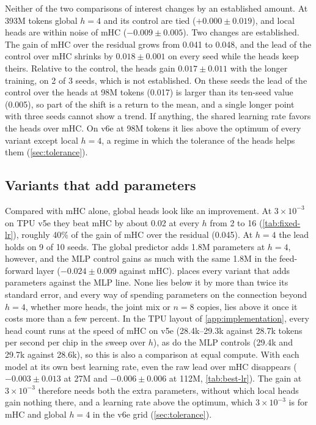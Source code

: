 \documentclass[11pt, a4paper]{article}
\newcommand{\lr}[1]{\ensuremath{#1 \times 10^{-3}}}
\begin{document}
Neither of the two comparisons of interest changes by an established amount. At 393M tokens global $h = 4$ and its control are tied
($+0.000 \pm 0.019$), and local heads are within noise of mHC ($-0.009 \pm 0.005$). Two changes are established. The gain of mHC over the residual grows from 0.041 to 0.048,
and the lead of the control over mHC shrinks by $0.018 \pm 0.001$ on every seed while the heads keep theirs. Relative to the control, the
heads gain $0.017 \pm 0.011$ with the longer training, on 2 of 3 seeds, which is not established. On these seeds the lead of the control over the heads at 98M tokens (0.017) is larger than its ten-seed value
(0.005), so part of the shift is a return to the mean, and a single longer point with three seeds cannot show a trend. If anything, the shared learning rate favors the heads over mHC. On v6e at 98M tokens it
lies above the optimum of every variant except local $h = 4$, a regime in which the tolerance of the heads helps them
(\cref{sec:tolerance}).

\subsection{Variants that add parameters}
\label{sec:fixed-lr}

Compared with mHC alone, global heads look like an improvement. At \lr{3} on TPU v5e they beat mHC by about 0.02 at every $h$ from 2 to
16 (\cref{tab:fixed-lr}), roughly 40\% of the gain of mHC over the residual (0.045). At $h = 4$ the lead holds on 9 of 10 seeds.
The global predictor adds 1.8M parameters at $h = 4$, however, and the MLP control gains as much with the same 1.8M in the
feed-forward layer ($-0.024 \pm 0.009$ against mHC).  places every variant that adds parameters against the MLP
line. None lies below it by more than twice its standard error, and every way of spending parameters on the connection beyond $h =
4$, whether more heads, the joint mix or $n = 8$ copies, lies above it once it costs more than a few percent. In the TPU layout of
\cref{app:implementation}, every head count runs at the speed of mHC on v5e (28.4k--29.3k against 28.7k tokens per second per
chip in the sweep over $h$), as do the MLP controls (29.4k and 29.7k against 28.6k), so this is also a comparison at equal
compute. With each model at its own best learning rate, even the raw lead over mHC disappears ($-0.003 \pm 0.013$ at 27M and
$-0.006 \pm 0.006$ at 112M, \cref{tab:best-lr}). The gain at \lr{3} therefore needs both the extra parameters, without which
local heads gain nothing there, and a learning rate above the optimum, which \lr{3} is for mHC and global $h = 4$ in the v6e grid
(\cref{sec:tolerance}).
\end{document}
